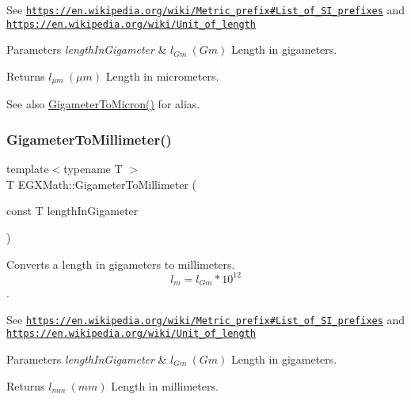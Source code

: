 See \href{https://en.wikipedia.org/wiki/Metric_prefix#List_of_SI_prefixes}{\tt https\+://en.\+wikipedia.\+org/wiki/\+Metric\+\_\+prefix\#\+List\+\_\+of\+\_\+\+S\+I\+\_\+prefixes} and \href{https://en.wikipedia.org/wiki/Unit_of_length}{\tt https\+://en.\+wikipedia.\+org/wiki/\+Unit\+\_\+of\+\_\+length} 
\begin{DoxyParams}{Parameters}
{\em length\+In\+Gigameter} & $ l_{Gm}\ (Gm)$ Length in gigameters. \\
\hline
\end{DoxyParams}
\begin{DoxyReturn}{Returns}
$ l_{\mu m}\ (\mu m)$ Length in micrometers. 
\end{DoxyReturn}
\begin{DoxySeeAlso}{See also}
\mbox{\hyperlink{group___e_g_x_math-_conversions-_length_conversions-_gigameter-_non-_s_i_ga90426d22455e96b1f61e1850c7b89f77}{Gigameter\+To\+Micron()}} for alias. 
\end{DoxySeeAlso}
\mbox{\label{group___e_g_x_math-_conversions-_length_conversions-_gigameter-_s_i_ga91b617f8bf6330f1379d3372e4968254}} 
\subsubsection{\texorpdfstring{Gigameter\+To\+Millimeter()}{GigameterToMillimeter()}}
{\footnotesize\ttfamily template$<$typename T $>$ \\
T E\+G\+X\+Math\+::\+Gigameter\+To\+Millimeter (\begin{DoxyParamCaption}\item[{const T}]{length\+In\+Gigameter }\end{DoxyParamCaption})}



Converts a length in gigameters to millimeters. \[ l_{m}=l_{Gm} * 10^{12} \]. 

See \href{https://en.wikipedia.org/wiki/Metric_prefix#List_of_SI_prefixes}{\tt https\+://en.\+wikipedia.\+org/wiki/\+Metric\+\_\+prefix\#\+List\+\_\+of\+\_\+\+S\+I\+\_\+prefixes} and \href{https://en.wikipedia.org/wiki/Unit_of_length}{\tt https\+://en.\+wikipedia.\+org/wiki/\+Unit\+\_\+of\+\_\+length} 
\begin{DoxyParams}{Parameters}
{\em length\+In\+Gigameter} & $ l_{Gm}\ (Gm)$ Length in gigameters. \\
\hline
\end{DoxyParams}
\begin{DoxyReturn}{Returns}
$ l_{mm}\ (mm)$ Length in millimeters. 
\end{DoxyReturn}
\mbox{\label{group___e_g_x_math-_conversions-_length_conversions-_gigameter-_s_i_ga6538a7007f104833aa7ad690156342b5}} 
